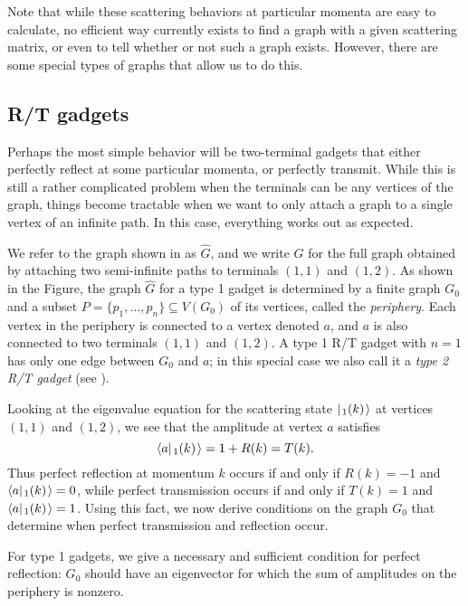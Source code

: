 \documentclass[../thesis-main/thesis-main]{subfiles}
\begin{document}
Note that while these scattering behaviors at particular momenta are easy to calculate, no efficient way currently exists to find a graph with a given scattering matrix, or even to tell whether or not such a graph exists.  However, there are some special types of graphs that allow us to do this.


\subsection{R/T gadgets}


Perhaps the most simple behavior will be two-terminal gadgets that either perfectly reflect at some particular momenta, or perfectly transmit.  While this is still a rather complicated problem when the terminals can be any vertices of the graph, things become tractable when we want to only attach a graph to a single vertex of an infinite path.  In this case, everything works out as expected.

We refer to the graph shown in  as $\hat{G}$, and we write $G$ for the full graph obtained by attaching two semi-infinite paths to terminals $(1,1)$ and $(1,2)$.  As shown in the Figure, the graph $\hat{G}$ for a type 1 gadget is determined by a finite graph $G_0$ and a subset $P = \{p_1,\ldots,p_n\} \subseteq V(G_0)$ of its vertices, called the \emph{periphery}.  Each vertex in the periphery is connected to a vertex denoted $a$, and $a$ is also connected to two terminals $(1,1)$ and $(1,2)$. A type 1 R/T gadget with $n=1$ has only one edge between $G_0$ and $a$; in this special case we also call it a \emph{type 2 R/T gadget} (see ).

Looking at the eigenvalue equation for the scattering state $|\mspace{2mu} \sc_{1} (k) \mspace{2mu} \rangle$ at vertices $(1,1)$ and $(1,2)$, we see that the amplitude at vertex $a$ satisfies
\[
  \langle{a}|\mspace{2mu} \sc_{1} (k) \mspace{2mu} \rangle = 1 + R(k) = T(k).
\] 
Thus perfect reflection at momentum $k$ occurs if and only if $R(k)=-1$ and $\langle{a}|\mspace{2mu} \sc_{1} (k) \mspace{2mu} \rangle=0$, while perfect transmission occurs if and only if $T(k)=1$ and $\langle{a}|\mspace{2mu} \sc_{1} (k) \mspace{2mu} \rangle=1$. Using this fact, we now derive conditions on the graph $G_0$ that determine when perfect transmission and reflection occur.

For type 1 gadgets, we give a necessary and sufficient condition for perfect reflection: $G_0$ should have an eigenvector for which the sum of amplitudes on the periphery is nonzero.
\end{document}

